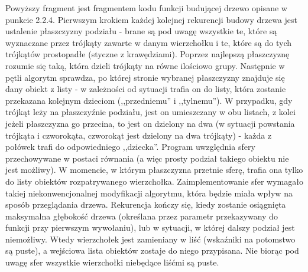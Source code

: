 Powyższy fragment jest fragmentem kodu funkcji budującej drzewo opisane w punkcie 2.2.4. Pierwszym krokiem każdej kolejnej rekurencji budowy drzewa jest ustalenie płaszczyzny podziału - brane są pod uwagę wszystkie te, które są wyznaczane przez trójkąty zawarte w danym wierzchołku i te, które są do tych trójkątów prostopadłe (styczne z krawędziami). Poprzez najlepszą płaszczyznę rozumie się taką, która dzieli trójkąty na równe ilościowo grupy. Następnie w pętli algorytm sprawdza, po której stronie wybranej płaszczyzny znajduje się dany obiekt z listy - w zależności od sytuacji trafia on do listy, która zostanie przekazana kolejnym dzieciom (,,przedniemu'' i ,,tylnemu''). W przypadku, gdy trójkąt leży na płaszczyźnie podziału, jest on umieszczany w obu listach, z kolei jeżeli płaszczyzna go przecina, to jest on dzielony na dwa (w sytuacji powstania trójkąta i czworokąta, czworokąt jest dzielony na dwa trójkąty) - każda z połówek trafi do odpowiedniego ,,dziecka''. 	Program uwzględnia sfery przechowywane w postaci równania (a więc prosty podział takiego obiektu nie jest możliwy). W momencie, w którym płaszczyzna przetnie sferę, trafia ona tylko do listy obiektów rozpatrywanego wierzchołka. Zaimplementowanie sfer wymagało takiej niekonwencjonalnej modyfikacji algorytmu, która będzie miała wpływ na sposób przeglądania drzewa. Rekurencja kończy się, kiedy zostanie osiągnięta maksymalna głębokość drzewa (określana przez parametr przekazywany do funkcji przy pierwszym wywołaniu), lub w sytuacji, w której dalszy podział jest niemożliwy. Wtedy wierzchołek jest zamieniany w liść (wskaźniki na potomstwo są puste), a wejściowa lista obiektów zostaje do niego przypisana. Nie biorąc pod uwagę sfer wszystkie wierzchołki niebędące liśćmi są puste.

